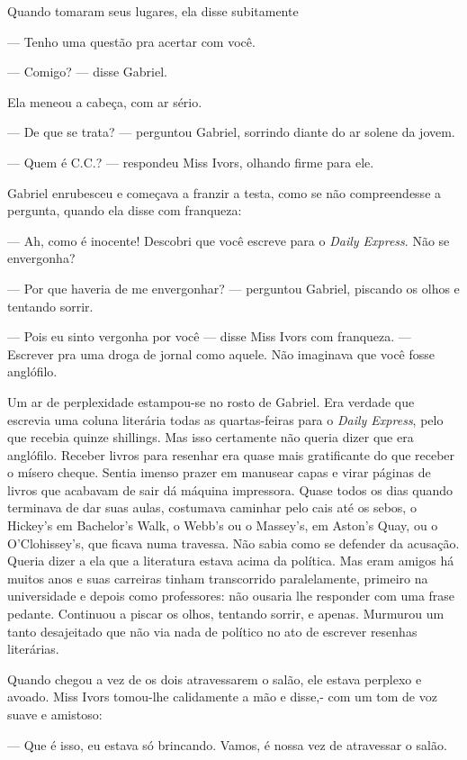 Quando tomaram seus lugares, ela disse subitamente

--- Tenho uma questão pra acertar com você.

--- Comigo? --- disse Gabriel.

Ela meneou a cabeça, com ar sério.

--- De que se trata? --- perguntou Gabriel, sorrindo diante do ar
solene da jovem.

--- Quem é C.C.? --- respondeu Miss Ivors, olhando firme para ele.

Gabriel enrubesceu e começava a franzir a testa, como se não
compreendesse a pergunta, quando ela disse com franqueza:

--- Ah, como é inocente! Descobri que você escreve para o \textit{Daily
Express}. Não se envergonha?

--- Por que haveria de me envergonhar? --- perguntou Gabriel, piscando
os olhos e tentando sorrir.

--- Pois eu sinto vergonha por você --- disse Miss Ivors com
franqueza. --- Escrever pra uma droga de jornal como aquele. Não
imaginava que você fosse anglófilo.

Um ar de perplexidade estampou-se no rosto de Gabriel. Era verdade que
escrevia uma coluna literária todas as quartas-feiras para o \textit{Daily
Express}, pelo que recebia quinze shillings. Mas isso certamente não
queria dizer que era anglófilo. Receber livros para resenhar era quase
mais gratificante do que receber o mísero cheque. Sentia imenso
prazer em manusear capas e virar páginas de livros que acabavam de
sair dá máquina impressora. Quase todos os dias quando terminava de
dar suas aulas, costumava caminhar pelo cais até os sebos, o Hickey's
em Bachelor's Walk, o Webb's ou o Massey's, em Aston's Quay, ou o
O'Clohissey's, que ficava numa travessa. Não sabia como se defender da
acusação. Queria dizer a ela que a literatura estava acima da
política. Mas eram amigos há muitos anos e suas carreiras tinham
transcorrido paralelamente, primeiro na universidade e depois como
professores: não ousaria lhe responder com uma frase pedante.
Continuou a piscar os olhos, tentando sorrir, e apenas. Murmurou um
tanto desajeitado que não via nada de político no ato de escrever
resenhas literárias.

Quando chegou a vez de os dois atravessarem o salão, ele estava
perplexo e avoado. Miss Ivors tomou-lhe calidamente a mão e disse,-
com um tom de voz suave e amistoso:

--- Que é isso, eu estava só brincando. Vamos, é nossa vez de
atravessar o salão.

